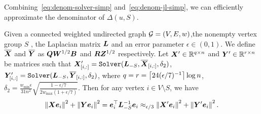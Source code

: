\documentclass[10pt,twocolumn,twoside]{IEEEtran}
\begin{document}
Combining~\eqref{eq:denom-solver-simp} and~\eqref{eq:denom-jl-simp}, we can efficiently approximate the denominator of \(\Delta(u,S)\).
\begin{lemma}\label{lem:approx-denom}
    Given a connected weighted undirected graph \(\mathcal{G}=(V,E,w)\),the nonempty vertex group \(S\) , the Laplacian matrix \(\boldsymbol{L}\) and an error parameter \(\epsilon\in(0,1)\).
    We define \(\overline{\boldsymbol{X}}\) and \(\overline{\boldsymbol{Y}}\) as \(\boldsymbol{Q}\boldsymbol{W}^{1/2}\boldsymbol{B}\) and \(\boldsymbol{R}\boldsymbol{Z}^{1/2}\) respectively.
    Let \(\boldsymbol{X}'\in\mathbb{R}^{q\times n}\) and \(\boldsymbol{Y}'\in\mathbb{R}^{r\times n}\) be matrices such that \(\boldsymbol{X}'_{[i,:]}=\mathtt{Solver}(\boldsymbol{L}_{-S},\overline{\boldsymbol{X}}_{[i,:]},\delta_2)\), \(\boldsymbol{Y}'_{[i,:]}=\mathtt{Solver}(\boldsymbol{L}_{-S},\overline{\boldsymbol{Y}}_{[i,:]},\delta_2)\), where \(q=r=\left\lceil24(\epsilon/7)^{-1}\right\rceil\log n\), \(\delta_2=\frac{w_{\min}\epsilon}{31n^2}\sqrt{\frac{1-\epsilon/7}{2w_{\max}(1+\epsilon/7)}}\). Then for any vertex \(i\in V\setminus S\), we have
    \begin{equation}\label{eq:approx-denom}
        \left\Vert\boldsymbol{X}\boldsymbol{e}_i\right\Vert^2+\left\Vert\boldsymbol{Y}\boldsymbol{e}_i\right\Vert^2=\boldsymbol{e}_i^\top\boldsymbol{L}_{-S}^{-1}\boldsymbol{e}_i\approx_{\epsilon/3}\left\Vert\boldsymbol{X}'\boldsymbol{e}_i\right\Vert^2+\left\Vert\boldsymbol{Y}'\boldsymbol{e}_i\right\Vert^2.
    \end{equation}
\end{lemma}
\end{document}
